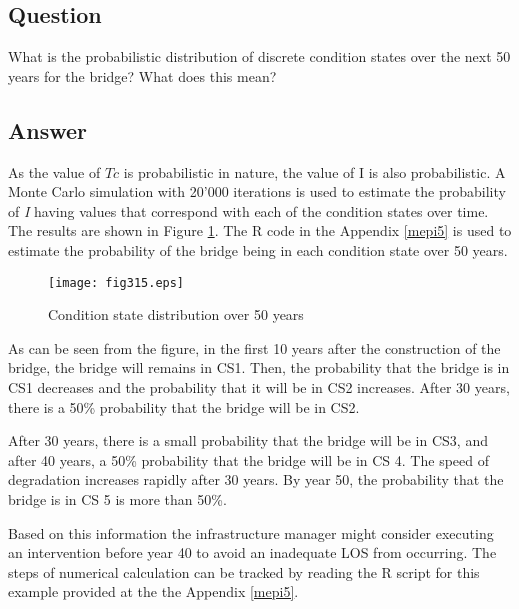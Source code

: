 \subsection{Question}
What is the probabilistic distribution of discrete condition states over the next 50 years for the bridge? What does this mean?

\subsection{Answer}
As the value of $Tc$ is probabilistic in nature, the value of I is also probabilistic. A Monte Carlo simulation with 20'000 iterations is used to estimate the probability of \textit{I} having values that correspond with each of the condition states over time. The results are shown in Figure \ref{fig:315}. The R code in the Appendix \ref{mepi5} is used to estimate the probability of the bridge being in each condition state over 50 years. 
\begin{figure}[h]
\texttt{[image: fig315.eps]}
\caption{Condition state distribution over 50 years}\label{fig:315}
\end{figure}
As can be seen from the figure, in the first 10 years after the construction of the bridge, the bridge will remains in CS1. Then, the probability that the bridge is in CS1 decreases and the probability that it will be in CS2 increases. After 30 years, there is a 50\% probability that the bridge will be in CS2.

After 30 years, there is a small probability that the bridge will be in CS3, and after 40 years, a 50\% probability that the bridge will be in CS 4. The speed of degradation increases rapidly after 30 years. By year 50, the probability that the bridge is in CS 5 is more than 50\%. 

Based on this information the infrastructure manager might consider executing an intervention before year 40 to avoid an inadequate LOS from occurring. The steps of numerical calculation can be tracked by reading the R script for this example provided at the the Appendix \ref{mepi5}.

%


\pagebreak

